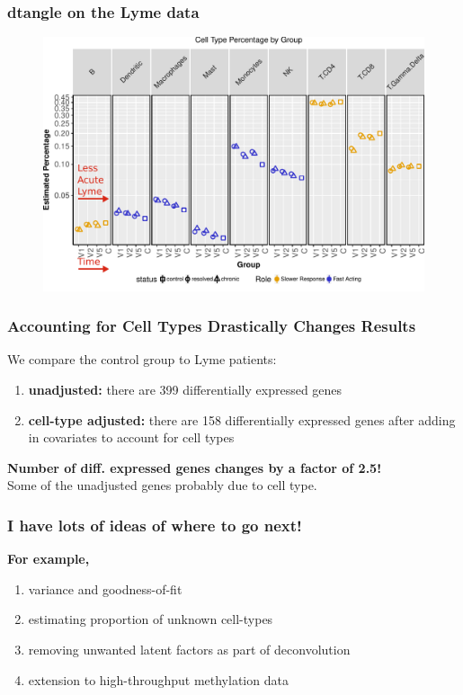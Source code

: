 \documentclass[usenames,dvipsnames,15pt,handout]{beamer}
\renewcommand{\alert}[1]{{\color{NavyBlue} #1}}
\newcommand{\cbo}{\color{BurntOrange}}
\begin{document}
\begin{frame}
  \frametitle{dtangle on the Lyme data}
    \vspace*{-.5cm}\begin{figure}
    \hspace*{-.9cm}\includegraphics[scale=.65]{pictures/ctypes2.pdf}
  \end{figure}
\end{frame}

\begin{frame}
  \frametitle{Accounting for Cell Types Drastically Changes Results}
  We compare the control group to Lyme patients:
  \begin{enumerate}
    \item {\bf unadjusted:} there are {\cbo 399} differentially expressed genes
    \item {\bf cell-type adjusted:} there are {\cbo 158} differentially expressed genes after adding in covariates to account for cell types
  \end{enumerate}

  {\bf Number of diff. expressed genes changes by a factor of 2.5!}\\
  \alert{Some of the unadjusted genes probably due to cell type.}
\end{frame}

\begin{frame}
  \frametitle{I have lots of ideas of where to go next!}
  {\bf For example,}
  \begin{enumerate}
  \item variance and goodness-of-fit 
  \item estimating proportion of unknown cell-types
  \item removing unwanted latent factors as part of deconvolution
  \item extension to high-throughput methylation data
  \end{enumerate}
\end{frame}
\end{document}
